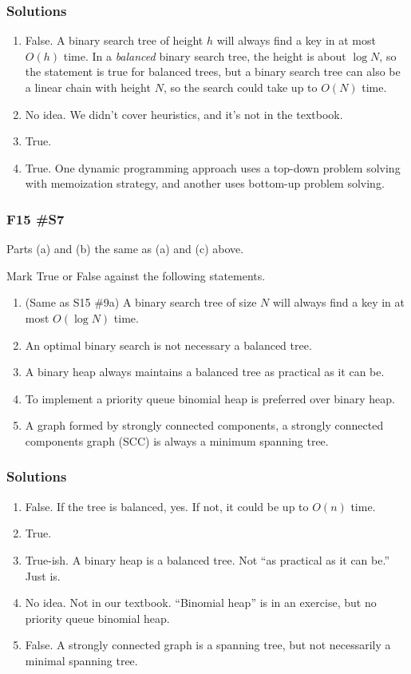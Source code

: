 \subsubsection{Solutions}

\begin{enumerate}[label=\alph*.]
	\item False.  A binary search tree of height $h$ will always find a key in at most $O(h)$ time.  In a {\it balanced} binary search tree, the height is about $\log N$, so the statement is true for balanced trees, but a binary search tree can also be a linear chain with height $N$, so the search could take up to $O(N)$ time.  
	\item No idea.  We didn't cover heuristics, and it's not in the textbook.
	\item True.  
	\item True.  One dynamic programming approach uses a top-down problem solving with memoization strategy, and another uses bottom-up problem solving.  
\end{enumerate}

\subsubsection{F15 \#S7}

Parts (a) and (b) the same as (a) and (c) above.  

	Mark True or False against the following statements.
	\begin{enumerate}[label=\alph*.]
		\item  (Same as S15 \#9a) A binary search tree of size $N$ will always find a key in at most $O(\log N)$ time.
		\item An optimal binary search is not necessary a balanced tree.
		\item A binary heap always maintains a balanced tree as practical as it can be.
		\item To implement a priority queue binomial heap is preferred over binary heap.
		\item A graph formed by strongly connected components, a strongly connected components graph (SCC) is always a minimum spanning tree.  
	\end{enumerate}
	
\subsubsection{Solutions}

\begin{enumerate}[label=\alph*.]
	\item False.  If the tree is balanced, yes.  If not, it could be up to $O(n)$ time.  
	\item True.  
	\item True-ish.  A binary heap is a balanced tree.  Not ``as practical as it can be.''  Just is.  
	\item No idea.  Not in our textbook.  ``Binomial heap'' is in an exercise, but no priority queue binomial heap.
	\item False.  A strongly connected graph is a spanning tree, but not necessarily a minimal spanning tree.  
\end{enumerate}
	

